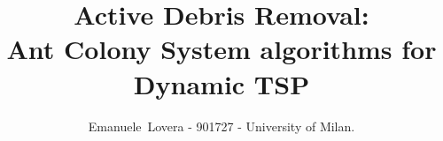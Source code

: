 \title{Active Debris Removal:\\Ant Colony System algorithms for Dynamic TSP}

%
%
\author{Emanuele~Lovera - 901727 - University of Milan. %
}


